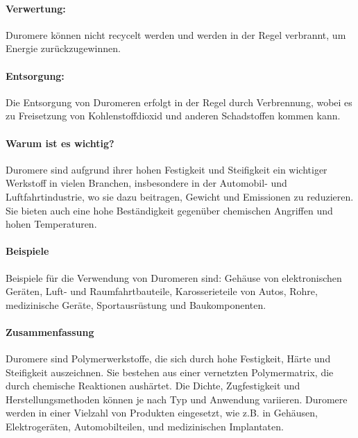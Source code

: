 \documentclass{article}
\begin{document}
\begin{multicols}{3}
\paragraph{Verwertung:}
Duromere können nicht recycelt werden und werden in der Regel verbrannt, um
Energie zurückzugewinnen.

\paragraph{Entsorgung:}
Die Entsorgung von Duromeren erfolgt in der Regel durch Verbrennung, wobei es
zu Freisetzung von Kohlenstoffdioxid und anderen Schadstoffen kommen kann.

\paragraph{Warum ist es wichtig?}
Duromere sind aufgrund ihrer hohen Festigkeit und Steifigkeit ein wichtiger
Werkstoff in vielen Branchen, insbesondere in der Automobil- und
Luftfahrtindustrie, wo sie dazu beitragen, Gewicht und Emissionen zu
reduzieren. Sie bieten auch eine hohe Beständigkeit gegenüber chemischen
Angriffen und hohen Temperaturen.

\paragraph{Beispiele}
Beispiele für die Verwendung von Duromeren sind: Gehäuse von elektronischen
Geräten, Luft- und Raumfahrtbauteile, Karosserieteile von Autos, Rohre,
medizinische Geräte, Sportausrüstung und Baukomponenten.

\paragraph{Zusammenfassung}
Duromere sind Polymerwerkstoffe, die sich durch hohe Festigkeit, Härte und
Steifigkeit auszeichnen. Sie bestehen aus einer vernetzten Polymermatrix, die
durch chemische Reaktionen aushärtet. Die Dichte, Zugfestigkeit und
Herstellungsmethoden können je nach Typ und Anwendung variieren. Duromere
werden in einer Vielzahl von Produkten eingesetzt, wie z.B. in Gehäusen,
Elektrogeräten, Automobilteilen, und medizinischen Implantaten.

\end{multicols}

\clearpage


\newpage
\pagestyle{fancy}
\fancyhf{}
\end{document}
